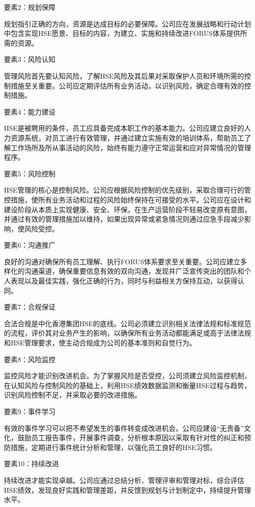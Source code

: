 \documentclass{book}
\begin{document}
要素2：规划保障

规划指引正确的方向，资源是达成目标的必要保障。公司应在发展战略和行动计划中包含实现HSE愿景、目标的内容，为建立、实施和持续改进FORUS体系提供所需的资源。

要素3：风险认知

管理风险首先要认知风险，了解HSE风险及其后果对采取保护人员和环境所需的控制措施至关重要。公司应定期评估所有业务活动，以识别风险，确定合理有效的控制措施。

要素4：能力建设

HSE是被聘用的条件，员工应具备完成本职工作的基本能力。公司应建立良好的人力资源系统，对员工进行有效管理，并通过建立实施有效的培训体系，帮助员工了解工作场所及所从事活动的风险，始终有能力遵守正常运营和应对异常情况的管理程序。

要素5：风险控制

HSE管理的核心是控制风险。公司应根据风险控制的优先级别，采取合理可行的管控措施，使所有业务活动和过程的风险始终保持在可接受的水平。公司应在设计和建设阶段从本质上实现健康、安全、环保，在生产运营阶段不轻易改变原有意图，并通过有效的管理措施加以维持，如果出现异常或紧急情况则通过应急手段减少影响，使风险受控。

要素6：沟通推广

良好的沟通对确保所有员工理解、执行FORUS体系要求至关重要。公司应建立多样化的沟通渠道，确保重要信息有效的双向沟通，发现并广泛宣传突出的团队和个人表现以及最佳实践，强化正确的行为，同时与利益相关方保持互动，以获得认同。

要素7：合规保证

合法合规是中化香港集团HSE的底线。公司必须建立识别相关法律法规和标准规范的流程，评价其对业务产生的影响，以确保所有业务活动都能满足或高于法律法规和HSE管理要求，使主动合规成为公司的基本准则和自觉行为。

要素8：风险监控

监控风险才能识别改进机会。为了掌握风险是否受控，公司须建立风险监控机制，在认知风险与控制风险的基础上，利用HSE绩效数据监测和衡量HSE过程与趋势，识别风险控制不足，并采取必要的改进措施。

要素9：事件学习

有效的事件学习可以把不希望发生的事件转变成改进机会。公司应建设“无责备”文化，鼓励员工报告事件，开展事件调查，分析根本原因以采取有针对性的纠正和预防措施，定期进行事件统计分析和管理，以强化员工良好的HSE习惯。

要素10：持续改进

持续改进才能实现卓越。公司应通过总结分析、管理评审和管理对标，综合评估HSE绩效，发现良好实践和管理差距，并反馈到规划与计划制定中，持续提升管理水平。
\end{document}
